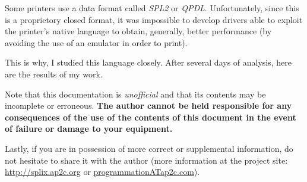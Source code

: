 Some printers use a data format called \emph{SPL2} or \emph{QPDL}.
Unfortunately, since this is a proprietory closed format, it was
impossible to develop drivers able to exploit the printer's native
language to obtain, generally, better performance
(by avoiding the use of an emulator in order to print).

This is why, I studied this language closely. After several days
of analysis, here are the results of my work.
\medskip

Note that this documentation is \emph{unofficial} and that its
contents may be incomplete or erroneous. \textbf{The author cannot
be held responsible for any consequences of the use of the contents
of this document in the event of failure or damage to your equipment.}
\medskip

Lastly, if you are in possession of more correct or supplemental
information,
do not hesitate to share it with
the author (more information at the project site:
\url{http://splix.ap2c.org} or \url{programmationATap2c.com}).
